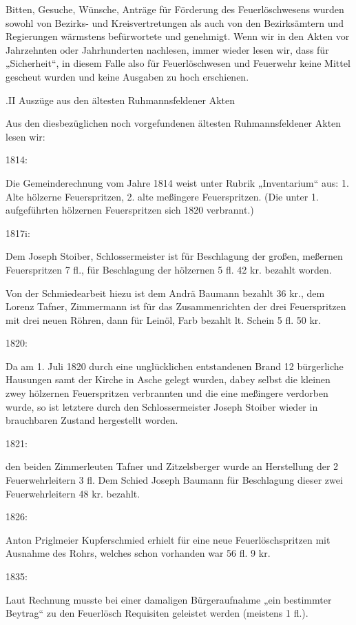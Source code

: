 Bitten, Gesuche, Wünsche, Anträge für Förderung des Feuerlöschwesens wurden
sowohl von Bezirks- und Kreisvertretungen als auch von den Bezirksämtern und
Regierungen wärmstens befürwortete und genehmigt. Wenn wir in den Akten vor
Jahrzehnten oder Jahrhunderten nachlesen, immer wieder lesen wir, dass für
„Sicherheit“, in diesem Falle also für Feuerlöschwesen und Feuerwehr keine
Mittel gescheut wurden und keine Ausgaben zu hoch erschienen.

.II Auszüge aus den ältesten Ruhmannsfeldener Akten

Aus den diesbezüglichen noch vorgefundenen ältesten Ruhmannsfeldener Akten lesen
wir:

1814:

Die Gemeinderechnung vom Jahre 1814 weist unter Rubrik „Inventarium“ aus: 1.
Alte hölzerne Feuerspritzen, 2. alte meßingere Feuerspritzen. (Die unter 1.
aufgeführten hölzernen Feuerspritzen sich 1820 verbrannt.)

1817i:

Dem Joseph Stoiber, Schlossermeister ist für Beschlagung der großen, meßernen
Feuerspritzen 7 fl., für Beschlagung der hölzernen 5 fl. 42 kr. bezahlt worden.

Von der Schmiedearbeit hiezu ist dem Andrä Baumann bezahlt 36 kr., dem Lorenz
Tafner, Zimmermann ist für das Zusammenrichten der drei Feuerspritzen mit drei
neuen Röhren, dann für Leinöl, Farb bezahlt lt. Schein 5 fl. 50 kr.

1820:

Da am 1. Juli 1820 durch eine unglücklichen entstandenen Brand 12 bürgerliche
Hausungen samt der Kirche in Asche gelegt wurden, dabey selbst die kleinen zwey
hölzernen Feuerspritzen verbrannten und die eine meßingere verdorben wurde, so
ist letztere durch den Schlossermeister Joseph Stoiber wieder in brauchbaren
Zustand hergestellt worden.

1821:

den beiden Zimmerleuten Tafner und Zitzelsberger wurde an Herstellung der 2
Feuerwehrleitern 3 fl. Dem Schied Joseph Baumann für Beschlagung dieser zwei
Feuerwehrleitern 48 kr. bezahlt.

1826:

Anton Priglmeier Kupferschmied erhielt für eine neue Feuerlöschspritzen mit
Ausnahme des Rohrs, welches schon vorhanden war 56 fl. 9 kr.

1835:

Laut Rechnung musste bei einer damaligen Bürgeraufnahme „ein bestimmter Beytrag“
zu den Feuerlösch Requisiten geleistet werden (meistens 1 fl.).

